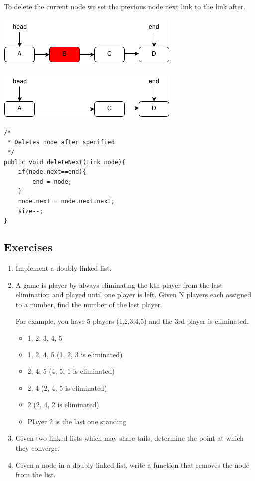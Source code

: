 \documentclass[11pt,oneside]{book}
\makeatletter
\def\maxwidth#1{\ifdim\Gin@nat@width>#1 #1\else\Gin@nat@width\fi}
\makeatother
\begin{document}
To delete the current node we set the previous node next link to the link after.

\includegraphics[width=\maxwidth{\textwidth}]{linkedlistrem.png}

\includegraphics[width=\maxwidth{\textwidth}]{linkedlistrem2.png}

\begin{lstlisting}
/*
 * Deletes node after specified
 */
public void deleteNext(Link node){
    if(node.next==end){
        end = node;
    }
    node.next = node.next.next;
    size--;
}
\end{lstlisting}

\subsection{Exercises}

\begin{enumerate}
\item Implement a doubly linked list.
\item A game is player by always eliminating the kth player from the last elimination and played until one player is left. Given N players each assigned to a number, find the number of the last player.

For example, you have 5 players (1,2,3,4,5) and the 3rd player is eliminated.

\begin{itemize}
\item 1, 2, 3, 4, 5 
\item 1, 2, 4, 5 (1, 2, 3 is eliminated)
\item 2, 4, 5 (4, 5, 1 is eliminated)
\item 2, 4 (2, 4, 5 is eliminated)
\item 2 (2, 4, 2 is eliminated)
\item Player 2 is the last one standing.
\end{itemize}
\item Given two linked lists which may share tails, determine the point at which they converge.
\item Given a node in a doubly linked list, write a function that removes the node from the list. 
\end{enumerate}
\end{document}
